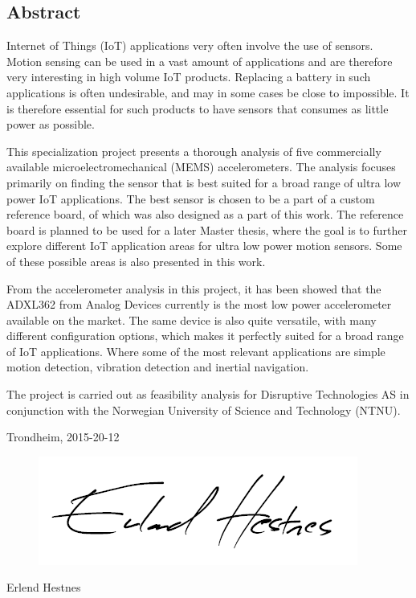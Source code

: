 \begin{center}
\section*{Abstract}
\end{center}

Internet of Things (IoT) applications very often involve the use of sensors. Motion sensing can be used in a vast amount of applications and are therefore very interesting in high volume IoT products. Replacing a battery in such applications is often undesirable, and may in some cases be close to impossible. It is therefore essential for such products to have sensors that consumes as little power as possible. 

This specialization project presents a thorough analysis of five commercially available microelectromechanical (MEMS) accelerometers. The analysis focuses primarily on finding the sensor that is best suited for a broad range of ultra low power IoT applications. The best sensor is chosen to be a part of a custom reference board, of which was also designed as a part of this work. The reference board is planned to be used for a later Master thesis, where the goal is to further explore different IoT application areas for ultra low power motion sensors. Some of these possible areas is also presented in this work. 

From the accelerometer analysis in this project, it has been showed that the ADXL362 from Analog Devices currently is the most low power accelerometer available on the market. The same device is also quite versatile, with many different configuration options, which makes it perfectly suited for a broad range of IoT applications. Where some of the most relevant applications are simple motion detection, vibration detection and inertial navigation.  

The project is carried out as feasibility analysis for Disruptive Technologies AS in conjunction with the Norwegian University of Science and Technology (NTNU).

\begin{center}
Trondheim, 2015-20-12\\[1pc]
\begin{figure}[h]
\centering
\includegraphics[scale=0.5]{fig/underskrift.png}
\label{fig:underskrift}
\end{figure}
Erlend Hestnes
\end{center}